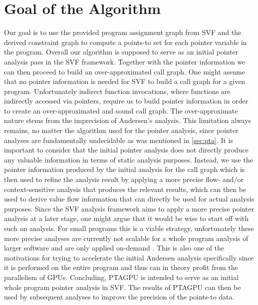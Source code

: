 \section{Goal of the Algorithm}
Our goal is to use the provided program assignment graph from SVF and the derived constraint graph to compute a points-to set for each pointer variable in the program.
Overall our algorithm is supposed to serve as an initial pointer analysis pass in the SVF framework. Together with the pointer information we can then proceed to build an over-approximated call graph.
One might assume that no pointer information is needed for SVF to build a call graph for a given program. Unfortunately indirect function invocations, where functions are indirectly accessed via pointers, require us to build pointer information in order to create an over-approximated and sound call graph. The over-approximate nature stems from the imprecision of Andersen's analysis. This limitation always remains, no matter the algorithm used for the pointer analysis, since pointer analyses are fundamentally undecidable as was mentioned in \autoref{sec:pta}.
It is important to consider that the initial pointer analysis does not directly produce any valuable information in terms of static analysis purposes. Instead, we use the pointer information produced by the initial analysis for the call graph which is then used to refine the analysis result by applying a more precise flow- and/or context-sensitive analysis that produces the relevant results, which can then be used to derive value flow information that can directly be used for actual analysis purposes.
Since the SVF analysis framework aims to apply a more precise pointer analysis at a later stage, one might argue that it would be wise to start off with such an analysis. For small programs this is a viable strategy, unfortunately these more precise analyses are currently not scalable for a whole program analysis of larger software and are only applied on-demand \cite{sui2016svf}. This is also one of the motivations for trying to accelerate the initial Andersen analysis specifically since it is performed on the entire program and thus can in theory profit from the parallelism of GPUs.
Concluding, PTAGPU is intended to serve as an initial whole program pointer analysis in SVF. The results of PTAGPU can then be used by subsequent analyses to improve the precision of the points-to data. 

